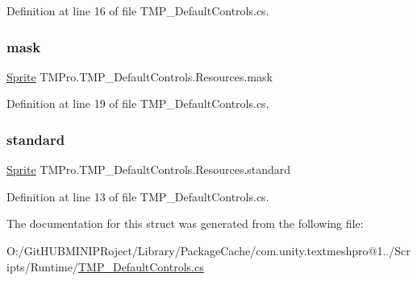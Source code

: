 Definition at line 16 of file T\+M\+P\+\_\+\+Default\+Controls.\+cs.

\mbox{\label{struct_t_m_pro_1_1_t_m_p___default_controls_1_1_resources_ab169512950fe9ffcca5df349be390f06}} 
\subsubsection{\texorpdfstring{mask}{mask}}
{\footnotesize\ttfamily \mbox{\hyperlink{namespace_t_m_pro_ab5662f47179bf1b81c575ecf80b24065a51f2b7b14433aa22c67d1f4fc18943cd}{Sprite}} T\+M\+Pro.\+T\+M\+P\+\_\+\+Default\+Controls.\+Resources.\+mask}



Definition at line 19 of file T\+M\+P\+\_\+\+Default\+Controls.\+cs.

\mbox{\label{struct_t_m_pro_1_1_t_m_p___default_controls_1_1_resources_aef20379f590b4d805b658c5d0a47e88d}} 
\subsubsection{\texorpdfstring{standard}{standard}}
{\footnotesize\ttfamily \mbox{\hyperlink{namespace_t_m_pro_ab5662f47179bf1b81c575ecf80b24065a51f2b7b14433aa22c67d1f4fc18943cd}{Sprite}} T\+M\+Pro.\+T\+M\+P\+\_\+\+Default\+Controls.\+Resources.\+standard}



Definition at line 13 of file T\+M\+P\+\_\+\+Default\+Controls.\+cs.



The documentation for this struct was generated from the following file\+:\begin{DoxyCompactItemize}
\item 
O\+:/\+Git\+H\+U\+B\+M\+I\+N\+I\+P\+Roject/\+Library/\+Package\+Cache/com.\+unity.\+textmeshpro@1../\+Scripts/\+Runtime/\mbox{\hyperlink{_t_m_p___default_controls_8cs}{T\+M\+P\+\_\+\+Default\+Controls.\+cs}}\end{DoxyCompactItemize}
